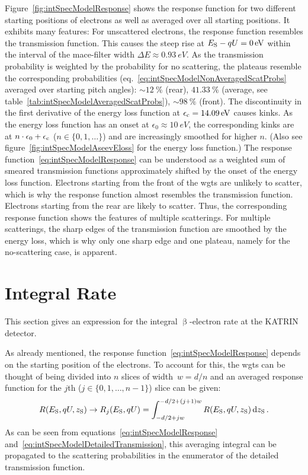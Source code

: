 Figure~\ref{fig:intSpecModelResponse} shows the response function for two different starting positions of electrons as well as averaged over all starting positions. It exhibits many features: For unscattered electrons, the response function resembles the transmission function. This causes the steep rise at $E_\mathrm{S}-qU=\SI{0}{eV}$ within the interval of the \gls{mace}-filter width $\Delta E\approx\SI{0.93}{eV}$. As the transmission probability is weighted by the probability for no scattering, the plateaus resemble the corresponding probabilities (eq.~\ref{eq:intSpecModelNonAveragedScatProbs} averaged over starting pitch angles): $\sim\SI{12}{\percent}$ (rear), $\SI{41.33}{\percent}$ (average, see table~\ref{tab:intSpecModelAveragedScatProbs}), $\sim\SI{98}{\percent}$ (front).
The discontinuity in the first derivative of the energy loss function at $\epsilon_\mathrm{c}=\SI{14.09}{eV}$ causes kinks. As the energy loss function has an onset at $\epsilon_0\approx\SI{10}{eV}$, the corresponding kinks are at $n\cdot\epsilon_0+\epsilon_\mathrm{c}$ ($n\in\{0,1,\dots\}$) and are increasingly smoothed for higher $n$. (Also see figure~\ref{fig:intSpecModelAseevEloss} for the energy loss function.) 
The response function~\eqref{eq:intSpecModelResponse} can be understood as a weighted sum of smeared transmission functions approximately shifted by the onset of the energy loss function. Electrons starting from the front of the \gls{wgts} are unlikely to scatter, which is why the response function almost resembles the transmission function. Electrons starting from the rear are likely to scatter. Thus, the corresponding response function shows the features of multiple scatterings. For multiple scatterings, the sharp edges of the transmission function are smoothed by the energy loss, which is why only one sharp edge and one plateau, namely for the no-scattering case, is apparent.

\section{Integral Rate}
\label{sec:intSpecModelIntegralRate}
This section gives an expression for the integral $\upbeta$-electron rate at the KATRIN detector. 

As already mentioned, the response function~\eqref{eq:intSpecModelResponse} depends on the starting position of the electrons. To account for this, the \gls{wgts} can be thought of being divided into $n$ slices of width~$w=d/n$ and an averaged response function for the $j$th ($j\in\{0,1,\dots,n-1\}$) slice can be given:
\begin{equation}
	R(E_\mathrm{S},qU,z_\mathrm{S}) \rightarrow
	R_j(E_\mathrm{S},qU) =
	\int_{-d/2+jw}^{-d/2+(j+1)w}
		R(E_\mathrm{S},qU,z_\mathrm{S})
	\mathop{}\!\mathrm{d} z_\mathrm{S}
	\text{\,.}
\end{equation}
As can be seen from equations~\eqref{eq:intSpecModelResponse} and~\eqref{eq:intSpecModelDetailedTransmission}, this averaging integral can be propagated to the scattering probabilities in the enumerator of the detailed transmission function.


